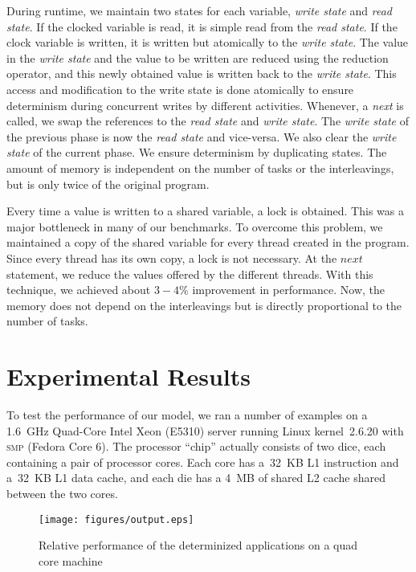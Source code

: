 \documentclass[10pt, conference, compsocconf]{IEEEtran}
\begin{document}
During runtime, we maintain two states for each variable, \emph{write state} and \emph{read state}.
If the clocked variable is read, it is simple read from the \emph{read state}. If the clock
variable is written, it is written but atomically to the \emph{write state}.  The value in the \emph{write
state} and the value to be written are reduced using the reduction operator, and this newly obtained
value is written back to the \emph{write state}. This access and modification to the write state is done
atomically to ensure determinism during concurrent writes by different activities.
Whenever, a \emph{next} is called, we swap the references to the \emph{read state} and \emph{write state}.
The \emph{write state} of the previous phase is now the \emph{read state} and vice-versa.
We also clear the \emph{write state} of the current phase.
We ensure determinism by duplicating states. The amount of memory is independent on the number
of tasks or the interleavings, but is only twice of the original program.


Every time a value is written to a shared variable, a lock is obtained. This was a major
bottleneck in many of our benchmarks. To overcome this problem, we maintained a copy
of the shared variable for every thread created in the program. Since every thread
has its own copy, a lock is not necessary. At the $next$ statement, we reduce
the values offered by the different threads. With this technique, we achieved
about $3-4\%$ improvement in performance. Now, the memory does not depend
on the interleavings but is directly proportional to the number of tasks.




\section{Experimental Results}
\label{sec:experimental}

To test the performance of our model, we ran a number of examples on a 1.6~GHz
Quad-Core Intel Xeon (E5310) server running Linux kernel~2.6.20 with
\textsc{smp} (Fedora Core 6).  The processor ``chip'' actually
consists of two dice, each containing a pair of processor cores.  Each
core has a~32~KB L1 instruction and a~32~KB L1 data cache, and each
die has a 4~MB of shared L2 cache shared between the two cores.

\begin{figure*}[htbp]
\texttt{[image: figures/output.eps]}
\caption{Relative performance of the determinized applications on a quad core machine}
\label{fig:output}
\end{figure*}
\end{document}
